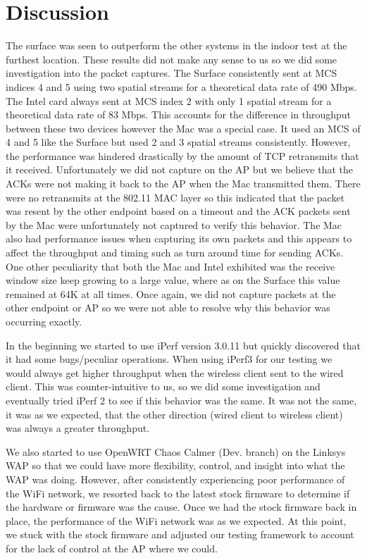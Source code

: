 \section{Discussion}

The surface was seen to outperform the other systems in the indoor test at the furthest location. These results did not make any sense to us so we did some investigation into the packet captures. The Surface consistently sent at MCS indices 4 and 5 using two spatial streams for a theoretical data rate of 490 Mbps. The Intel card always sent at MCS index 2 with only 1 spatial stream for a theoretical data rate of 83 Mbps. This accounts for the difference in throughput between these two devices however the Mac was a special case. It used an MCS of 4 and 5 like the Surface but used 2 and 3 spatial streams consistently. However, the performance was hindered drastically by the amount of TCP retransmits that it received. Unfortunately we did not capture on the AP but we believe that the ACKs were not making it back to the AP when the Mac transmitted them. There were no retransmits at the 802.11 MAC layer so this indicated that the packet was resent by the other endpoint based on a timeout and the ACK packets sent by the Mac were unfortunately not captured to verify this behavior. The Mac also had performance issues when capturing its own packets and this appears to affect the throughput and timing such as turn around time for sending ACKs. One other peculiarity that both the Mac and Intel exhibited was the receive window size keep growing to a large value, where as on the Surface this value remained at 64K at all times. Once again, we did not capture packets at the other endpoint or AP so we were not able to resolve why this behavior was occurring exactly.

In the beginning we started to use iPerf version 3.0.11 but quickly discovered that it had some bugs/peculiar operations. When using iPerf3 for our testing we would always get higher throughput when the wireless client sent to the wired client. This was counter-intuitive to us, so we did some investigation and eventually tried iPerf 2 to see if this behavior was the same. It was not the same, it was as we expected, that the other direction (wired client to wireless client) was always a greater throughput.

We also started to use OpenWRT Chaos Calmer (Dev. branch) on the Linksys WAP so that we could have more flexibility, control, and insight into what the WAP was doing. However, after consistently experiencing poor performance of the WiFi network, we resorted back to the latest stock firmware to determine if the hardware or firmware was the cause. Once we had the stock firmware back in place, the performance of the WiFi network was as we expected. At this point, we stuck with the stock firmware and adjusted our testing framework to account for the lack of control at the AP where we could.
